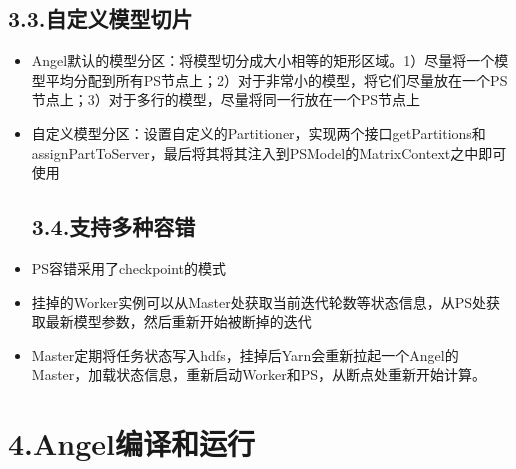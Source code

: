 \documentclass{article}
\begin{document}
\subsection{3.3.\hspace*{0.5em}自定义模型切片}\label{section}%

\begin{itemize}[noitemsep,topsep=\mdcompacttopsep]%

\item{}Angel默认的模型分区：将模型切分成大小相等的矩形区域。1）尽量将一个模型平均分配到所有PS节点上；2）对于非常小的模型，将它们尽量放在一个PS节点上；3）对于多行的模型，尽量将同一行放在一个PS节点上%

\item{}自定义模型分区：设置自定义的Partitioner，实现两个接口getPartitions和assignPartToServer，最后将其将其注入到PSModel的MatrixContext之中即可使用

\subsection{3.4.\hspace*{0.5em}支持多种容错}\label{section}%

\item{}PS容错采用了checkpoint的模式%

\item{}挂掉的Worker实例可以从Master处获取当前迭代轮数等状态信息，从PS处获取最新模型参数，然后重新开始被断掉的迭代%

\item{}Master定期将任务状态写入hdfs，挂掉后Yarn会重新拉起一个Angel的Master，加载状态信息，重新启动Worker和PS，从断点处重新开始计算。%
\end{itemize}%

\section{4.\hspace*{0.5em}Angel编译和运行}\label{sec-angel}%
\end{document}
